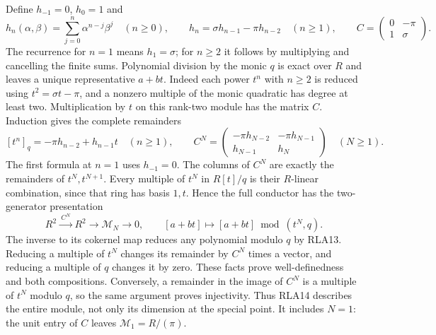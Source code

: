 Define $h_{-1}=0$, $h_0=1$ and
\[
 h_n(\alpha,\beta)=\sum_{j=0}^n\alpha^{n-j}\beta^j\quad(n\ge0),
 \qquad h_n=\sigma h_{n-1}-\pi h_{n-2}\quad(n\ge1),\qquad
 C=\begin{pmatrix}0&-\pi\\1&\sigma\end{pmatrix}.
 \tag{RLA12}
\]
The recurrence for $n=1$ means $h_1=\sigma$; for $n\ge2$ it
follows by multiplying and cancelling the finite sums.
Polynomial division by the monic $q$ is exact over $R$ and leaves
a unique representative $a+bt$.  Indeed each power $t^n$ with
$n\ge2$ is reduced using $t^2=\sigma t-\pi$, and a nonzero
multiple of the monic quadratic has degree at least two.
Multiplication by $t$ on this rank-two module has the matrix $C$.
Induction gives the complete remainders
\[
 [t^n]_q=-\pi h_{n-2}+h_{n-1}t\quad(n\ge1),\qquad
 C^N=\begin{pmatrix}
 -\pi h_{N-2}&-\pi h_{N-1}\\h_{N-1}&h_N
 \end{pmatrix}\quad(N\ge1).
 \tag{RLA13}
\]
The first formula at $n=1$ uses $h_{-1}=0$.
The columns of $C^N$ are exactly the remainders of $t^N,t^{N+1}$.
Every multiple of $t^N$ in $R[t]/q$ is their $R$-linear combination,
since that ring has basis $1,t$.  Hence the full conductor has the
two-generator presentation
\[
 R^2\xrightarrow{\ C^N\ }R^2\longrightarrow\mathcal M_N
 \longrightarrow0,\qquad
 [a+bt]\longmapsto[a+bt]\bmod(t^N,q).
 \tag{RLA14}
\]
The inverse to its cokernel map reduces any polynomial modulo $q$
by RLA13.  Reducing a multiple of $t^N$ changes its remainder by
$C^N$ times a vector, and reducing a multiple of $q$ changes it by
zero.  These facts prove well-definedness and both compositions.
Conversely, a remainder in the image of $C^N$ is a multiple of
$t^N$ modulo $q$, so the same argument proves injectivity.
Thus RLA14 describes the entire module, not only its dimension at
the special point.  It includes $N=1$: the unit entry of $C$ leaves
$\mathcal M_1=R/(\pi)$.

